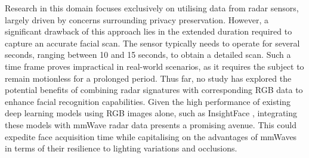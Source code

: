 \documentclass{mpaper}
\begin{document}
Research in this domain focuses exclusively on utilising data from radar sensors, largely driven by concerns surrounding privacy preservation. However, a significant drawback of this approach lies in the extended duration required to capture an accurate facial scan. The sensor typically needs to operate for several seconds, ranging between 10 and 15 seconds, to obtain a detailed scan. Such a time frame proves impractical in real-world scenarios, as it requires the subject to remain motionless for a prolonged period. Thus far, no study has explored the potential benefits of combining radar signatures with corresponding RGB data to enhance facial recognition capabilities. Given the high performance of existing deep learning models using RGB images alone, such as InsightFace \cite{deng2018arcface}, integrating these models with mmWave radar data presents a promising avenue. This could expedite face acquisition time while capitalising on the advantages of mmWaves in terms of their resilience to lighting variations and occlusions.
\end{document}
